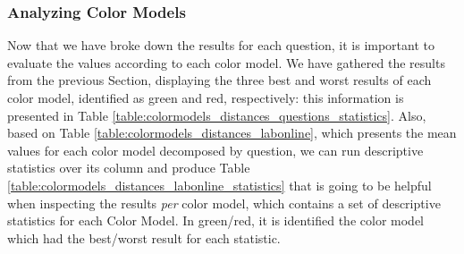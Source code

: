 \subsubsection{Analyzing Color Models}
\label{subsubsec:models_analyzing}
%
Now that we have broke down the results for each question, it is important to evaluate the values according to each color model. We have gathered
the results from the previous Section, displaying the three best and worst results of each color model, identified as green and red, respectively:
this information is presented in Table \ref{table:colormodels_distances_questions_statistics}. Also, based on Table \ref{table:colormodels_distances_labonline},
which presents the mean values for each color model decomposed by question, we can run descriptive statistics over its column and produce Table
\ref{table:colormodels_distances_labonline_statistics} that is going to be helpful when inspecting the results \emph{per} color model, which contains
a set of descriptive statistics for each Color Model. In green/red, it is identified the color model which had the best/worst result for each statistic. \par
%
